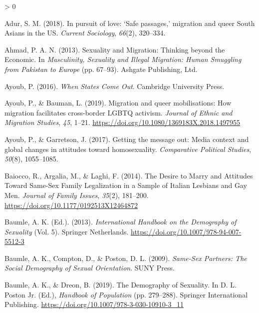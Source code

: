 \documentclass[
  11pt,
]{article}
\newlength{\cslhangindent}
\newenvironment{CSLReferences}[2] %
 {%
  \setlength{\parindent}{0pt}
  \ifodd #1 \everypar{\setlength{\hangindent}{\cslhangindent}}\ignorespaces\fi
  \ifnum #2 > 0
  \setlength{\parskip}{#2\baselineskip}
  \fi
 }%
 {}
\begin{document}
\hypertarget{refs}{}
\begin{CSLReferences}{1}{0}
\leavevmode\hypertarget{ref-adur_2018}{}%
Adur, S. M. (2018). In pursuit of love: {`{Safe} passages,'} migration and queer {South Asians} in the {US}. \emph{Current Sociology}, \emph{66}(2), 320--334.

\leavevmode\hypertarget{ref-ahmad_2013}{}%
Ahmad, P. A. N. (2013). Sexuality and {Migration}: {Thinking} beyond the {Economic}. In \emph{Masculinity, {Sexuality} and {Illegal Migration}: {Human Smuggling} from {Pakistan} to {Europe}} (pp. 67--93). {Ashgate Publishing, Ltd.}

\leavevmode\hypertarget{ref-ayoub_2016}{}%
Ayoub, P. (2016). \emph{When {States Come Out}}. {Cambridge University Press}.

\leavevmode\hypertarget{ref-ayoub_2019_migration}{}%
Ayoub, P., \& Bauman, L. (2019). Migration and queer mobilisations: How migration facilitates cross-border {LGBTQ} activism. \emph{Journal of Ethnic and Migration Studies}, \emph{45}, 1--21. \url{https://doi.org/10.1080/1369183X.2018.1497955}

\leavevmode\hypertarget{ref-ayoub_2017}{}%
Ayoub, P., \& Garretson, J. (2017). Getting the message out: {Media} context and global changes in attitudes toward homosexuality. \emph{Comparative Political Studies}, \emph{50}(8), 1055--1085.

\leavevmode\hypertarget{ref-baiocco_2014_desire}{}%
Baiocco, R., Argalia, M., \& Laghi, F. (2014). The {Desire} to {Marry} and {Attitudes Toward Same}-{Sex Family Legalization} in a {Sample} of {Italian Lesbians} and {Gay Men}. \emph{Journal of Family Issues}, \emph{35}(2), 181--200. \url{https://doi.org/10.1177/0192513X12464872}

\leavevmode\hypertarget{ref-baumle_2013}{}%
Baumle, A. K. (Ed.). (2013). \emph{International {Handbook} on the {Demography} of {Sexuality}} (Vol. 5). {Springer Netherlands}. \url{https://doi.org/10.1007/978-94-007-5512-3}

\leavevmode\hypertarget{ref-baumle_2009}{}%
Baumle, A. K., Compton, D., \& Poston, D. L. (2009). \emph{Same-{Sex Partners}: {The Social Demography} of {Sexual Orientation}}. {SUNY Press}.

\leavevmode\hypertarget{ref-baumle_2019}{}%
Baumle, A. K., \& Dreon, B. (2019). The {Demography} of {Sexuality}. In D. L. Poston Jr. (Ed.), \emph{Handbook of {Population}} (pp. 279--288). {Springer International Publishing}. \url{https://doi.org/10.1007/978-3-030-10910-3_11}


\end{CSLReferences}
\end{document}
